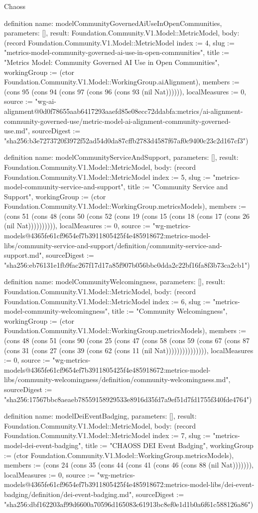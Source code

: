 \begin{lexlean}{Chaoss}
\begin{semanticmodule}
definition{
  name: modelCommunityGovernedAiUseInOpenCommunities,
  parameters: [],
  result: Foundation.Community.V1.Model::MetricModel,
  body: (record Foundation.Community.V1.Model::MetricModel {index := 4, slug := "metrics-model-community-governed-ai-use-in-open-communities", title := "Metrics Model: Community Governed AI Use in Open Communities", workingGroup := (ctor Foundation.Community.V1.Model::WorkingGroup.aiAlignment), members := (cons 95 (cons 94 (cons 97 (cons 96 (cons 93 (nil Nat)))))), localMeasures := 0, source := "wg-ai-alignment@0d0f78655aab6417293aaefd85e08ecc72ddabfa:metrics/ai-alignment-community-governed-use/metric-model-ai-alignment-community-governed-use.md", sourceDigest := "sha256:b3e7273720f3972f52ad54d0da87cffb2783d4587f67af0c9400c23c2d167cf3"})
}

definition{
  name: modelCommunityServiceAndSupport,
  parameters: [],
  result: Foundation.Community.V1.Model::MetricModel,
  body: (record Foundation.Community.V1.Model::MetricModel {index := 5, slug := "metrics-model-community-service-and-support", title := "Community Service and Support", workingGroup := (ctor Foundation.Community.V1.Model::WorkingGroup.metricsModels), members := (cons 51 (cons 48 (cons 50 (cons 52 (cons 19 (cons 15 (cons 18 (cons 17 (cons 26 (nil Nat)))))))))), localMeasures := 0, source := "wg-metrics-models@4365fe61cf9654ef7b3911805425f4e485918672:metrics-model-libs/community-service-and-support/definition/community-service-and-support.md", sourceDigest := "sha256:eb76131e1fb9fac267f17d17a85f907b056bbc0dda2c22bf16fa8f3b73ca2cb1"})
}

definition{
  name: modelCommunityWelcomingness,
  parameters: [],
  result: Foundation.Community.V1.Model::MetricModel,
  body: (record Foundation.Community.V1.Model::MetricModel {index := 6, slug := "metrics-model-community-welcomingness", title := "Community Welcomingness", workingGroup := (ctor Foundation.Community.V1.Model::WorkingGroup.metricsModels), members := (cons 48 (cons 51 (cons 90 (cons 25 (cons 47 (cons 58 (cons 59 (cons 67 (cons 87 (cons 31 (cons 27 (cons 39 (cons 62 (cons 11 (nil Nat))))))))))))))), localMeasures := 0, source := "wg-metrics-models@4365fe61cf9654ef7b3911805425f4e485918672:metrics-model-libs/community-welcomingness/definition/community-welcomingness.md", sourceDigest := "sha256:17567bbc8aeaeb78559158929533e8916d35fd7a9ef51d7fd1755f340fde4764"})
}

definition{
  name: modelDeiEventBadging,
  parameters: [],
  result: Foundation.Community.V1.Model::MetricModel,
  body: (record Foundation.Community.V1.Model::MetricModel {index := 7, slug := "metrics-model-dei-event-badging", title := "CHAOSS DEI Event Badging", workingGroup := (ctor Foundation.Community.V1.Model::WorkingGroup.metricsModels), members := (cons 24 (cons 35 (cons 44 (cons 41 (cons 46 (cons 88 (nil Nat))))))), localMeasures := 0, source := "wg-metrics-models@4365fe61cf9654ef7b3911805425f4e485918672:metrics-model-libs/dei-event-badging/definition/dei-event-badging.md", sourceDigest := "sha256:dbf162203af99d6600a70596d165083c61913bc8ef0e1d1b0a6f61c588126a86"})
}


\end{semanticmodule}
\end{lexlean}
